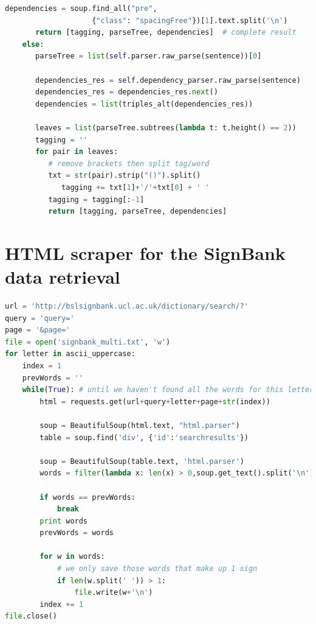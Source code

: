 \documentclass[12pt]{ociamthesis}  %
\begin{document}
{\begin{lstlisting}[language=Python, caption = Obtaining the data from the remote or local parser, label = lst:parse]
       dependencies = soup.find_all("pre", 
                    {"class": "spacingFree"})[1].text.split('\n')             
       return [tagging, parseTree, dependencies]  # complete result
    else:
       parseTree = list(self.parser.raw_parse(sentence))[0]

       dependencies_res = self.dependency_parser.raw_parse(sentence)
       dependencies_res = dependencies_res.next()
       dependencies = list(triples_alt(dependencies_res))

       leaves = list(parseTree.subtrees(lambda t: t.height() == 2))
       tagging = ''
       for pair in leaves:
          # remove brackets then split tag/word
          txt = str(pair).strip("()").split() 
             tagging += txt[1]+'/'+txt[0] + ' '
          tagging = tagging[:-1]
          return [tagging, parseTree, dependencies]
\end{lstlisting}

\newpage
\section{HTML scraper for the SignBank data retrieval}
\label{scraper}
\begin{lstlisting}[language=Python, caption = Python code for parsing the SignBank website, label = lst:parse]
url = 'http://bslsignbank.ucl.ac.uk/dictionary/search/?'
query = 'query='
page = '&page='
file = open('signbank_multi.txt', 'w')
for letter in ascii_uppercase:
    index = 1
    prevWords = ''
    while(True): # until we haven't found all the words for this letter
        html = requests.get(url+query+letter+page+str(index))
        
        soup = BeautifulSoup(html.text, "html.parser")
        table = soup.find('div', {'id':'searchresults'})
        
        soup = BeautifulSoup(table.text, 'html.parser')
        words = filter(lambda x: len(x) > 0,soup.get_text().split('\n'))
        
        if words == prevWords:
            break
        print words
        prevWords = words
        
        for w in words:
            # we only save those words that make up 1 sign
            if len(w.split(' ')) > 1:
                file.write(w+'\n')
        index += 1
file.close()
\end{lstlisting}

\newpage
}
\end{document}
